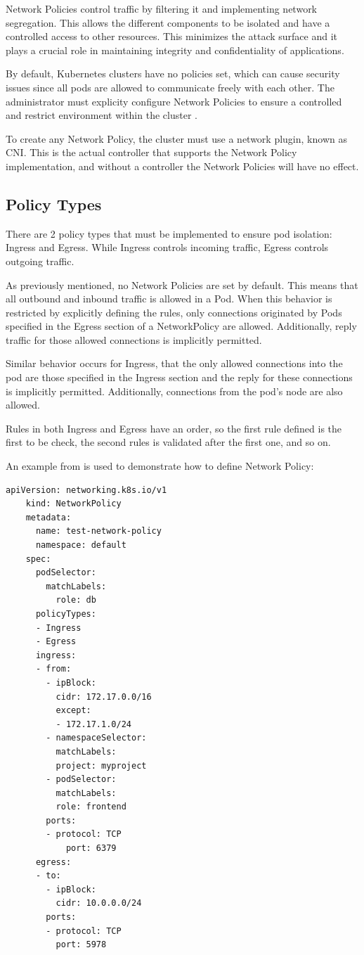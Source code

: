 \documentclass[a4paper,11pt,openright,BCOR=15mm]{scrbook}
\begin{document}
Network Policies control traffic by filtering it and implementing network segregation. This allows the different components to be isolated and have a controlled access to other resources. This minimizes the attack surface and it plays a crucial role in maintaining integrity and confidentiality of applications.

By default, Kubernetes clusters have no policies set, which can cause security issues since all pods are allowed to communicate freely with each other. The administrator must explicity configure Network Policies to ensure a controlled and restrict environment within the cluster \cite{amaechi_learn_2023}.

To create any Network Policy, the cluster must use a network plugin, known as CNI. This is the actual controller that supports the Network Policy implementation, and without a controller the Network Policies will have no effect.

\subsection{Policy Types}

There are 2 policy types that must be implemented to ensure pod isolation: Ingress and Egress. While Ingress controls incoming traffic, Egress controls outgoing traffic.

As previously mentioned, no Network Policies are set by default. This means that all outbound and inbound traffic is allowed in a Pod. When this behavior is restricted by explicitly defining the rules, only connections originated by Pods specified in the Egress section of a NetworkPolicy are allowed. Additionally, reply traffic for those allowed connections is implicitly permitted. \cite{walker_kubernetes_2023}

Similar behavior occurs for Ingress, that the only allowed connections into the pod are those specified in the Ingress section and the reply for these connections is implicitly permitted. Additionally, connections from the pod's node are also allowed.

Rules in both Ingress and Egress have an order, so the first rule defined is the first to be check, the second rules is validated after the first one, and so on.

An example from \cite{network_policies_kubernetes_from_kubernetes_io} is used to demonstrate how to define Network Policy:

\begin{lstlisting}[style=yaml,caption={NetworkPolicies example},label=code:netPolicies]
	apiVersion: networking.k8s.io/v1
	kind: NetworkPolicy
	metadata:
	  name: test-network-policy
	  namespace: default
	spec:
	  podSelector:
		matchLabels:
		  role: db
	  policyTypes:
	  - Ingress
	  - Egress
	  ingress:
	  - from:
		- ipBlock:
		  cidr: 172.17.0.0/16
		  except:
		  - 172.17.1.0/24
		- namespaceSelector:
		  matchLabels:
		  project: myproject
		- podSelector:
		  matchLabels:
		  role: frontend
		ports:
		- protocol: TCP
			port: 6379
	  egress:
	  - to:
		- ipBlock:
		  cidr: 10.0.0.0/24
		ports:
		- protocol: TCP
		  port: 5978
\end{lstlisting}
\end{document}
